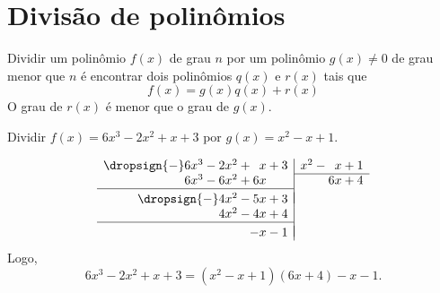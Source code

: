 \section{Divisão de polinômios}

Dividir um polinômio $f(x)$ de grau $n$ por um polinômio $g(x)\neq 0$ de grau
menor que $n$ é encontrar dois polinômios $q(x)$ e $r(x)$ tais que
\[
  f(x) = g(x) q(x) + r(x)
\]
O grau de $r(x)$ é menor que o grau de $g(x)$.

\begin{example}
  Dividir $f(x)=6x^3-2x^2+x+3$ por $g(x)=x^2-x+1$.

  \solution
  \[
    \begin{array}{r|r}
      \dropsign{-} 6x^3 - 2x^2 + \phantom{6}x + 3 & x^2 - \phantom{6}x + 1 \\ \cline{2-2}
      6x^3 - 6x^2 + 6x \phantom{{}+3}             & 6x + 4                 \\ \cline{1-1}
                                                  &  \\[\dimexpr-\normalbaselineskip+\jot]
      \dropsign{-} 4x^2 - 5x + 3                  &  \\
      4x^2 - 4x + 4                               &  \\ \cline{1-1}
                                                  &  \\[\dimexpr-\normalbaselineskip+\jot]
      -  x - 1                                    &
    \end{array}
  \]
  Logo,
  \[
    6x^3 - 2x^2 + x+3 = (x^2-x+1)(6x+4) - x-1.
  \]
\end{example}

